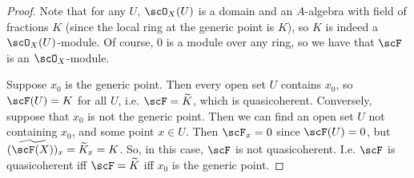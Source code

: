 \begin{proof}
	Note that for any $U$, $\scO_X(U)$ is a domain and an $A$-algebra with field of fractions $K$ (since the local ring at the generic point is $K$), so $K$ is indeed a $\scO_X(U)$-module. Of course, $0$ is a module over any ring, so we have that $\scF$ is an $\scO_X$-module.
	
	Suppose $x_0$ is the generic point. Then every open set $U$ contains $x_0$, so $\scF(U) = K$ for all $U$, i.e. $\scF = \widetilde{K}$, which is quasicoherent. Conversely, suppose that $x_0$ is not the generic point. Then we can find an open set $U$ not containing $x_0$, and some point $x \in U$. Then $\scF_x = 0$ since $\scF(U) = 0$, but $(\widetilde{\scF(X)})_x = \widetilde{K}_x = K$. So, in this case, $\scF$ is not quasicoherent. I.e. $\scF$ is quasicoherent iff $\scF = \widetilde{K}$ iff $x_0$ is the generic point.
\end{proof}
